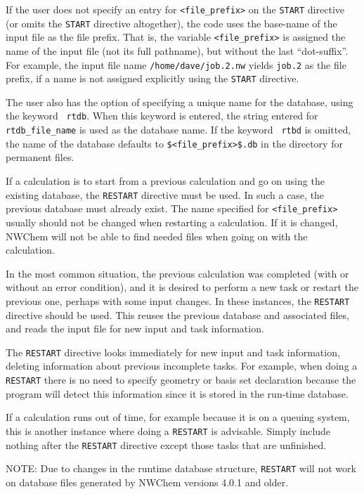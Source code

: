If the user does not specify an entry for {\tt <file\_prefix>} on the
\verb+START+ directive (or omits the \verb+START+ directive
altogether), the code uses the base-name of the input file as the file
prefix.  That is, the variable {\tt <file\_prefix>} is assigned the
name of the input file (not its full pathname), but without the last
``dot-suffix''.  For example, the input file name
\verb+/home/dave/job.2.nw+ yields \verb+job.2+ as the file prefix, if
a name is not assigned explicitly using the \verb+START+ directive.

The user also has the option of
specifying a unique name for the database, using the keyword {\tt
  rtdb}.  When this keyword is entered, the string entered for {\tt
  rtdb\_file\_name} is used as the database name.  If the keyword {\tt
  rtbd} is omitted, the name of the database defaults to
\verb+$<file_prefix>$.db+ in the directory for permanent files.

If a calculation is to start from a previous calculation and go on
using the existing database, the \verb+RESTART+ directive 
must be used.  In such a case, the previous
database must already exist.  The name specified for {\tt <file\_prefix>} 
usually should
not be changed when restarting a calculation.  If it is changed, NWChem 
will not
be able to find needed files when going on with the
calculation.

In the most common
situation, the previous calculation was completed (with or without an error
condition), and it is desired to perform a new task or restart the
previous one, perhaps with some input changes.  In these instances,
the \verb+RESTART+ directive should be used.  This reuses the previous
database and associated files, and reads the input file for new input
and task information.

The \verb+RESTART+ directive looks immediately for new input and task
information, deleting information about previous incomplete tasks.
For example, when doing a \verb+RESTART+ there is no need
to specify geometry or basis set declaration because the 
program will detect this information since it is stored in the
run-time database.

If a calculation runs out of time, for example because it is
on a queuing system, this is another instance where doing a
\verb+RESTART+ is advisable.  Simply include nothing after the
\verb+RESTART+ directive except those tasks that are unfinished.

NOTE: Due to changes in the runtime database structure, \verb+RESTART+ 
will not work on database files generated by NWChem versions 4.0.1 and 
older.

